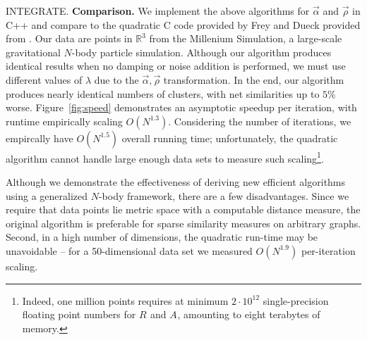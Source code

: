 \documentclass{article}
\newcommand{\respo}[2]{R_{#1#2}}
\newcommand{\avail}[2]{A_{#1#2}}
\newcommand{\vecrho}{\vec{\rho}}
\newcommand{\vecalpha}{\vec{\alpha}}
\begin{document}
INTEGRATE. {\bf Comparison.}
We implement the above algorithms for $\vecalpha$ and $\vecrho$ in C++ and compare to the quadratic C code provided by Frey and Dueck provided from \cite{affinity}.
Our data are points in $\mathbb{R}^3$ from the Millenium Simulation, a large-scale gravitational $N$-body particle simulation\cite{simulation}.
Although our algorithm produces identical results when no damping or noise addition is performed, we must use different values of $\lambda$ due to the $\vecalpha,\vecrho$ transformation.
In the end, our algorithm produces nearly identical numbers of clusters, with net similarities up to $5\%$ worse.
Figure~\ref{fig:speed} demonstrates an asymptotic speedup per iteration, with runtime empirically scaling $O(N^{1.3})$.
Considering the number of iterations, we empircally have $O(N^{1.5})$ overall running time; unfortunately, the quadratic algorithm cannot handle large enough data sets to measure such scaling\footnote{Indeed, one million points requires at minimum $2 \cdot 10^{12}$ single-precision floating point numbers for $\respo{}{}$ and $\avail{}{}$, amounting to eight terabytes of memory.}.

Although we demonstrate the effectiveness of deriving new efficient algorithms using a generalized $N$-body framework, there are a few disadvantages.
Since we require that data points lie metric space with a computable distance measure, the original algorithm is preferable for sparse similarity measures on arbitrary graphs.
Second, in a high number of dimensions, the quadratic run-time may be unavoidable -- for a 50-dimensional data set we measured $O(N^{1.9})$ per-iteration scaling.
\end{document}
